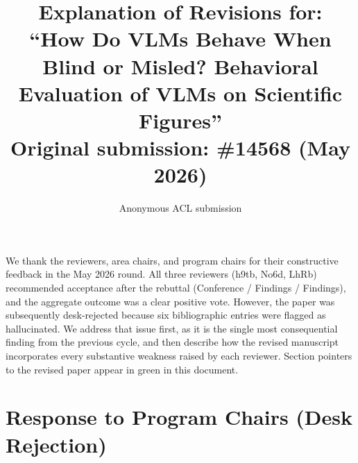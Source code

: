 \documentclass[11pt]{article}
\newcommand{\RevisionPaperTitle}{How Do VLMs Behave When Blind or Misled? Behavioral Evaluation of VLMs on Scientific Figures}
\newcommand{\RevisionOriginalSubmissionNumber}{14568 (May 2026)}
\newcommand{\revsec}[1]{\textcolor{revisiongreen}{#1}}
\begin{document}
\title{Explanation of Revisions for:\\
``\RevisionPaperTitle''\\[0.5em]
\normalsize\textmd{Original submission: \#\RevisionOriginalSubmissionNumber}}

\author{Anonymous ACL submission}

\maketitle

We thank the reviewers, area chairs, and program chairs for their constructive feedback in the May 2026 round. All three reviewers (h9tb, No6d, LhRb) recommended acceptance after the rebuttal (Conference / Findings / Findings), and the aggregate outcome was a clear positive vote. However, the paper was subsequently desk-rejected because six bibliographic entries were flagged as hallucinated. We address that issue first, as it is the single most consequential finding from the previous cycle, and then describe how the revised manuscript incorporates every substantive weakness raised by each reviewer. Section pointers to the revised paper appear in \revsec{green} in this document.

\section{Response to Program Chairs (Desk Rejection)}
\end{document}
